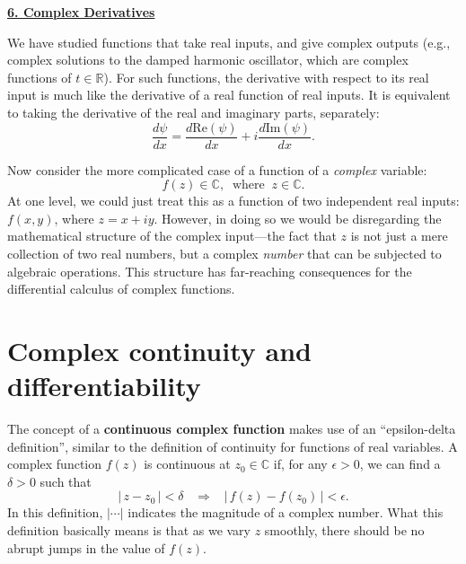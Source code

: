 \documentclass[10pt,a4paper]{article}
\begin{document}
\setcounter{page}{39}
\noindent
\underline{\textbf{\LARGE 6. Complex Derivatives}}
\vskip 0.1in

We have studied functions that take real inputs, and give complex
outputs (e.g., complex solutions to the damped harmonic oscillator,
which are complex functions of $t \in \mathbb{R}$). For such
functions, the derivative with respect to its real input is much like
the derivative of a real function of real inputs.  It is equivalent to
taking the derivative of the real and imaginary parts, separately:
\begin{equation}
  \frac{d\psi}{dx}
  = \frac{d\mathrm{Re}(\psi)}{dx} + i \frac{d\mathrm{Im}(\psi)}{dx}.
\end{equation}

Now consider the more complicated case of a function of a
\emph{complex} variable:
\begin{equation}
  f(z) \in \mathbb{C}, \;\;\mathrm{where}\;\; z \in \mathbb{C}.
\end{equation}
At one level, we could just treat this as a function of two
independent real inputs: $f(x,y)$, where $z = x + i y$. However, in
doing so we would be disregarding the mathematical structure of the
complex input---the fact that $z$ is not just a mere collection of two
real numbers, but a complex \emph{number} that can be subjected to
algebraic operations. This structure has far-reaching consequences for
the differential calculus of complex functions.

\section{Complex continuity and differentiability}
\label{complex-continuity-and-differentiability}

The concept of a \textbf{continuous complex function} makes use of an
``epsilon-delta definition'', similar to the definition of continuity
for functions of real variables. A complex function $f(z)$ is
continuous at $z_0 \in \mathbb{C}$ if, for any $\epsilon > 0$, we can
find a $\delta > 0$ such that
\begin{equation}
  \big|\, z - z_0 \,\big| < \delta \;\;\; \Rightarrow
  \;\;\; \big|\, f(z) - f(z_0) \,\big| < \epsilon.
\end{equation}
In this definition, $\big|\cdots\big|$ indicates the magnitude of a
complex number.  What this definition basically means is that as we
vary $z$ smoothly, there should be no abrupt jumps in the value of
$f(z)$.
\end{document}
